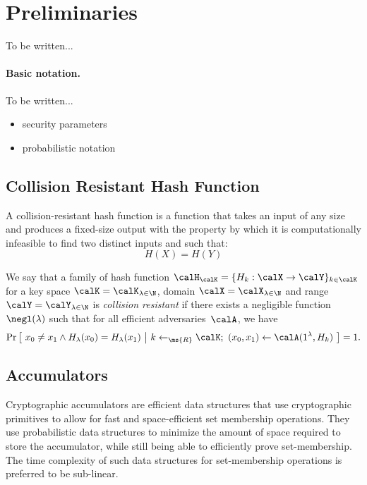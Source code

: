 \section{Preliminaries}

To be written...

\paragraph{Basic notation.}
\label{sec:notation}

To be written...
\begin{itemize}[noitemsep]
    \item security parameters
    \item probabilistic notation
\end{itemize}

\subsection{Collision Resistant Hash Function}

A collision-resistant hash function is a function  that takes an input 
of any size and produces a fixed-size output with the property by which it is 
computationally infeasible to find two distinct inputs  and  
such that: 
\begin{equation} H(X) = H(Y)\end{equation}

\newcommand{\getsr}{\gets_{\ms{R}}}

\begin{definition}
    We say that a family of hash function $\calH_\calK = \{ H_k: \calX \to
    \calY \}_{k \in \calK}$ for a key space $\calK = \calK_{\lambda \in \N}$,
    domain $\calX = \calX_{\lambda \in \N}$ and range $\calY = \calY_{\lambda
    \in \N}$ is \emph{collision resistant} if there exists a negligible
    function $\negl(\lambda)$ such that for all efficient adversaries~$\calA$,
    we have
    \[ \Pr \big[~ x_0 \neq x_1 \land H_\lambda(x_0) = H_\lambda(x_1) ~\big|~
        k \getsr \calK;~ (x_0, x_1) \gets \calA(1^\lambda, H_k)
        ~\big] = 1 .\]
\end{definition}

\subsection{Accumulators}

Cryptographic accumulators are efficient data structures that use cryptographic 
primitives to allow for fast and space-efficient set membership operations. They
use probabilistic data structures to minimize the amount of space required to 
store the accumulator, while still being able to efficiently prove set-membership.
The time complexity of such data structures for set-membership operations is 
preferred to be sub-linear.

